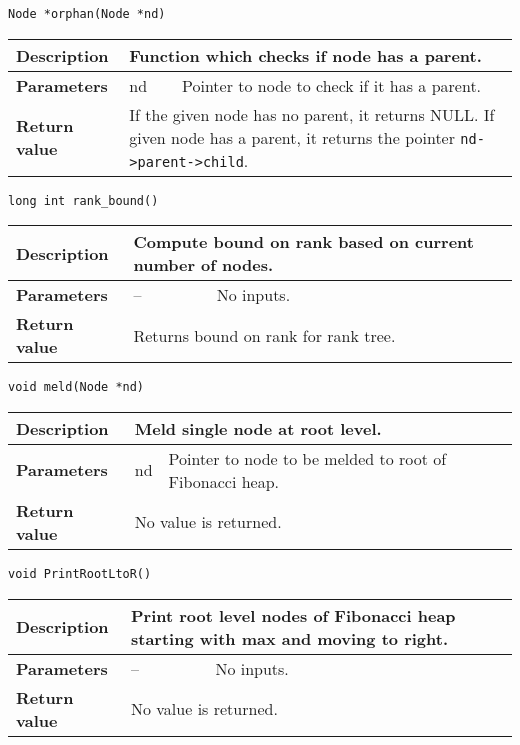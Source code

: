 \documentclass[12pt, reqno]{amsart}
\begin{document}
{\large \texttt{Node *orphan(Node *nd)}}
\begin{center}
    \begin{tabular}{| l | p{2.5cm} | p{9.5cm} |}
    \hline
    {\bfseries Description} & \multicolumn{2}{p{12.5cm}|}{Function which checks if node has a parent.} \\ \hline
    \multirow{1}{*}{\bfseries Parameters} & nd & Pointer to node to check if it has a parent. \\ \hline
    {\bfseries Return value} & \multicolumn{2}{p{12.5cm}|}{If the given node has no parent, it returns NULL. If given node has a parent, it returns the pointer \texttt{nd->parent->child}.} \\ \hline
    \end{tabular}
\end{center}    

{\large \texttt{long int rank\_bound()}}
\begin{center}
    \begin{tabular}{| l | p{2.5cm} | p{9.5cm} |}
    \hline
    {\bfseries Description} & \multicolumn{2}{p{12.5cm}|}{Compute bound on rank based on current number of nodes.} \\ \hline
    \multirow{1}{*}{\bfseries Parameters} & -- & No inputs. \\ \hline
    {\bfseries Return value} & \multicolumn{2}{p{12.5cm}|}{Returns bound on rank for rank tree.} \\ \hline
    \end{tabular}
\end{center}    

{\large \texttt{void meld(Node *nd)}}
\begin{center}
    \begin{tabular}{| l | p{2.5cm} | p{9.5cm} |}
    \hline
    {\bfseries Description} & \multicolumn{2}{p{12.5cm}|}{Meld single node at root level.} \\ \hline
    \multirow{1}{*}{\bfseries Parameters} & nd & Pointer to node to be melded to root of Fibonacci heap. \\ \hline
    {\bfseries Return value} & \multicolumn{2}{p{12.5cm}|}{No value is returned.} \\ \hline
    \end{tabular}
\end{center}  
 
{\large \texttt{void PrintRootLtoR()}}
\begin{center}
    \begin{tabular}{| l | p{2.5cm} | p{9.5cm} |}
    \hline
    {\bfseries Description} & \multicolumn{2}{p{12.5cm}|}{Print root level nodes of Fibonacci heap starting with max and moving to right.} \\ \hline
    \multirow{1}{*}{\bfseries Parameters} & -- & No inputs. \\ \hline
    {\bfseries Return value} & \multicolumn{2}{p{12.5cm}|}{No value is returned.} \\ \hline
    \end{tabular}
\end{center}
\end{document}
